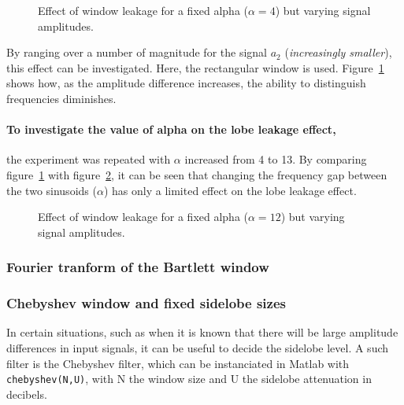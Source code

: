 \documentclass[main.tex]{subfiles}
\begin{document}
\begin{figure}[H]
	\centering 
	\resizebox{\textwidth}{!}{}
	\caption{Effect of window leakage for a fixed alpha ($\alpha=4$) but varying signal amplitudes.}
	\label{fig:q1_3_d-4}
\end{figure}

By ranging over a number of magnitude for the signal $a_2$ (\textit{increasingly smaller}), this effect can be investigated. Here, the rectangular window is used. Figure~\ref{fig:q1_3_d-4} shows how, as the amplitude difference increases, the ability to distinguish frequencies diminishes.


\paragraph{To investigate the value of alpha on the lobe leakage effect,} the experiment was repeated with $\alpha$ increased from 4 to 13. By comparing figure~\ref{fig:q1_3_d-4} with figure~\ref{fig:q1_3_d-12}, it can be seen that changing the frequency gap between the two sinusoids ($\alpha$) has only a limited effect on the lobe leakage effect. 

\begin{figure}[H]
	\centering 
	\resizebox{\textwidth}{!}{}
	\caption{Effect of window leakage for a fixed alpha ($\alpha=12$) but varying signal amplitudes.}
	\label{fig:q1_3_d-12}
\end{figure}



\subsubsection{Fourier tranform of the Bartlett window}




\subsubsection{Chebyshev window and fixed sidelobe sizes}

In certain situations, such as when it is known that there will be large amplitude differences in input signals, it can be useful to decide the sidelobe level. A such filter is the Chebyshev filter, which can be instanciated in Matlab with {\tt chebyshev(N,U)}, with N the window size and U the sidelobe attenuation in decibels.
\end{document}
